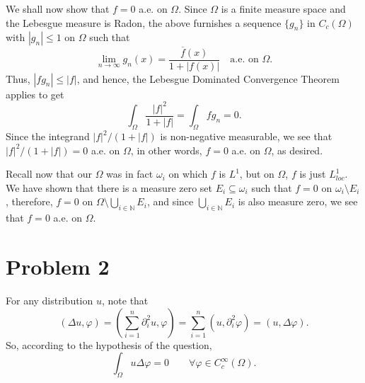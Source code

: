 \documentclass[10pt]{amsart}
\theoremstyle{thmstyle}
\theoremstyle{defstyle}
\newcommand{\N}{\mathbb{N}}
\renewcommand{\le}{\leqslant}
\begin{document}
We shall now show that $f = 0$ a.e. on $\Omega$. Since $\Omega$ is a finite measure space and the Lebesgue measure is Radon, the above furnishes a sequence $\{g_n\}$ in $C_c(\Omega)$ with $|g_n|\le 1$ on $\Omega$ such that 
\begin{equation*}
	\lim_{n\to\infty} g_n(x) = \frac{\overline f(x)}{1 + |f(x)|}\quad\text{a.e. on }\Omega.
\end{equation*}
Thus, $|fg_n|\le |f|$, and hence, the Lebesgue Dominated Convergence Theorem applies to get 
\begin{equation*}
	\int_{\Omega}\frac{|f|^2}{1 + |f|} = \int_{\Omega} fg_n = 0.
\end{equation*}
Since the integrand $|f|^2/(1 + |f|)$ is non-negative measurable, we see that $|f|^2/(1 + |f|) = 0$ a.e. on $\Omega$, in other words, $f = 0$ a.e. on $\Omega$, as desired.

Recall now that our $\Omega$ was in fact $\omega_i$ on which $f$ is $L^1$, but on $\Omega$, $f$ is just $L^1_{loc}$. We have shown that there is a measure zero set $E_i\subseteq\omega_i$ such that $f = 0$ on $\omega_i\setminus E_i$, therefore, $f = 0$ on $\Omega\setminus\bigcup_{i\in\N} E_i$, and since $\bigcup_{i\in\N} E_i$ is also measure zero, we see that $f = 0$ a.e. on $\Omega$.

\section{Problem 2}

For any distribution $u$, note that 
\begin{equation*}
	\left(\Delta u, \varphi\right) = \left(\sum_{i = 1}^n \partial_i^2 u,\varphi\right) = \sum_{i = 1}^n \left(u, \partial_i^2\varphi\right) = (u, \Delta\varphi).
\end{equation*}
So, according to the hypothesis of the question, 
\begin{equation*}
	\int_{\Omega} u\Delta\varphi = 0\qquad\forall\varphi\in C_c^\infty(\Omega).
\end{equation*}
\end{document}
